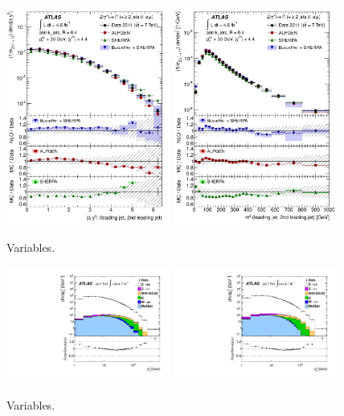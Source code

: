 \begin{figure}[tp]
  \centering
  \includegraphics[width=0.48\textwidth]{figures/STDM-2012-04/fig_11a}
  \includegraphics[width=0.48\textwidth]{figures/STDM-2012-04/fig_11b}
  \caption{Variables.}
  \label{fig:backgrounds-zjj}
\end{figure}

\begin{figure}[tp]
  \centering
  \includegraphics[width=0.48\textwidth]{figures/STDM-2012-23/fig_01a}
  \includegraphics[width=0.48\textwidth]{figures/STDM-2012-23/fig_01b}
  \caption{Variables.}
  \label{fig:backgrounds-zpt}
\end{figure}

